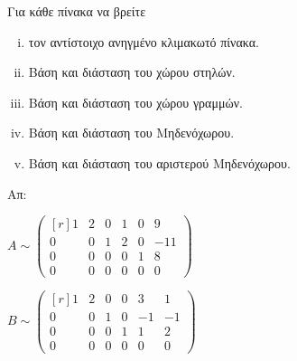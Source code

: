 \begin{enumerate}
    Για κάθε πίνακα να βρείτε
    \begin{enumerate}[(i)]
      \item τον αντίστοιχο ανηγμένο κλιμακωτό πίνακα. 
      \item Βάση και διάσταση του χώρου στηλών.
      \item Βάση και διάσταση του χώρου γραμμών.
      \item Βάση και διάσταση του Μηδενόχωρου.
      \item Βάση και διάσταση του αριστερού Μηδενόχωρου.
    \end{enumerate}	

    \hfill Απ:  
    \begin{enumerate*}[itemjoin=\hspace{1cm},label=(\alph*)]
      \item $ A \sim \begin{pmatrix*}[r]
          1 & 2 & 0 & 1 & 0 & 9 \\
          0 & 0 & 1 & 2 & 0 & -11 \\
          0 & 0 & 0 & 0 & 1 & 8 \\
          0 & 0 & 0 & 0 & 0 & 0 
        \end{pmatrix*} $
      \item $ B \sim \begin{pmatrix*}[r]
          1 & 2 & 0 & 0 & 3 & 1 \\
          0 & 0 & 1 & 0 & -1 & -1 \\
          0 & 0 & 0 & 1 & 1 & 2 \\
          0 & 0 & 0 & 0 & 0 & 0 
        \end{pmatrix*}$
    \end{enumerate*}


\end{enumerate}
